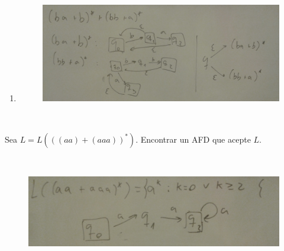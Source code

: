 \documentclass[twoside]{article}
\begin{document}
\begin{solucion}
\begin{enumerate}
\newpage

\item

\begin{figure}[h!]
\includegraphics[scale=0.1]{Automatas/6-4}
\end{figure}\ 
\end{enumerate}
\end{solucion}

\newpage

\begin{ejercicio}{7}
Sea $L = L(((aa) + (aaa))^*)$. Encontrar un AFD que acepte $L$.
\end{ejercicio}
\begin{solucion}\

\begin{figure}[h!]
\includegraphics[scale=0.2]{Automatas/7}
\end{figure}\
\end{solucion}

\newpage
\end{document}
